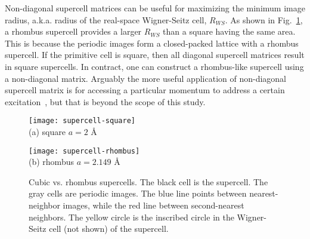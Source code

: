 Non-diagonal supercell matrices can be useful for maximizing the minimum image radius, a.k.a. radius of the real-space Wigner-Seitz cell, $R_{WS}$.
As shown in Fig.~\ref{fig:hsolid-square-vs-rhombus}, a rhombus supercell provides a larger $R_{WS}$ than a square having the same area.
This is because the periodic images form a closed-packed lattice with a rhombus supercell.
If the primitive cell is square, then all diagonal supercell matrices result in square supercells. In contract, one can construct a rhombus-like supercell using a non-diagonal matrix. Arguably the more useful application of non-diagonal supercell matrix is for accessing a particular momentum to address a certain excitation~\cite{Lloyd-Williams2015}, but that is beyond the scope of this study.
\begin{figure}[h]
\centering
\begin{minipage}{0.49\textwidth}
\centering
\texttt{[image: supercell-square]}\\
(a) square $a=2$ \AA
\end{minipage}
\begin{minipage}{0.49\textwidth}
\centering
\texttt{[image: supercell-rhombus]}\\
(b) rhombus $a=2.149$ \AA
\end{minipage}
\caption{Cubic vs. rhombus supercells. The black cell is the supercell. The gray cells are periodic images. The blue line points between nearest-neighbor images, while the red line between second-nearest neighbors. The yellow circle is the inscribed circle in the Wigner-Seitz cell (not shown) of the supercell.}
\label{fig:hsolid-square-vs-rhombus}
\end{figure}

